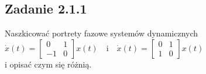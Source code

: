 \pagebreak
\subsection*{Zadanie 2.1.1} {\color{darkgray}
	Naszkicować portrety fazowe systemów dynamicznych\\
	$\dot{x}(t)=\left[\begin{array}{cc}0&1\\-1&0\end{array}\right]x(t)\ \ \ $ i $\ \ \ \dot{x}(t)=\left[\begin{array}{cc}0&1\\1&0\end{array}\right]x(t)$\\
	i opisać czym się różnią.\\
}\lineh
\\\\
